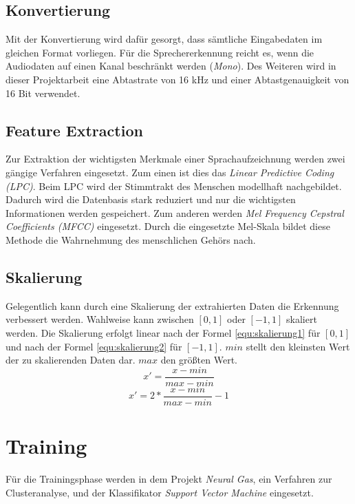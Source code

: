 \subsection{Konvertierung}
Mit der Konvertierung wird dafür gesorgt, dass sämtliche Eingabedaten im gleichen Format vorliegen. Für die Sprechererkennung reicht es, wenn die Audiodaten auf einen Kanal beschränkt werden (\emph{Mono}). Des Weiteren wird in dieser Projektarbeit eine Abtastrate von 16 kHz und einer Abtastgenauigkeit von 16 Bit verwendet.

\subsection{Feature Extraction}
Zur Extraktion der wichtigsten Merkmale einer Sprachaufzeichnung werden zwei gängige Verfahren eingesetzt. Zum einen ist dies das \emph{Linear Predictive Coding (LPC)}. Beim LPC wird der Stimmtrakt des Menschen modellhaft nachgebildet. Dadurch wird die Datenbasis stark reduziert und nur die wichtigsten Informationen werden gespeichert. Zum anderen werden \emph{Mel Frequency Cepstral Coefficients (MFCC)} eingesetzt. Durch die eingesetzte Mel-Skala bildet diese Methode die Wahrnehmung des menschlichen Gehörs nach. \cite{bib:mfcc}

\subsection{Skalierung}
Gelegentlich kann durch eine Skalierung der extrahierten Daten die Erkennung verbessert werden. Wahlweise kann zwischen $[0,1]$ oder $[-1,1]$ skaliert werden. Die Skalierung erfolgt linear nach der Formel \ref{equ:skalierung1} für $[0,1]$ und nach der Formel \ref{equ:skalierung2} für $[-1,1]$. $min$ stellt den kleinsten Wert der zu skalierenden Daten dar. $max$ den größten Wert. \cite{bib:svmfaq}
\begin{equation}
	\label{equ:skalierung1}
	x'=\frac{x-min}{max-min}
\end{equation}
\begin{equation}
	\label{equ:skalierung2}
	x'=2*\frac{x-min}{max-min}-1
\end{equation}

\section{Training}
Für die Trainingsphase werden in dem Projekt \emph{Neural Gas}, ein Verfahren zur Clusteranalyse, und der Klassifikator \emph{Support Vector Machine} eingesetzt. 

